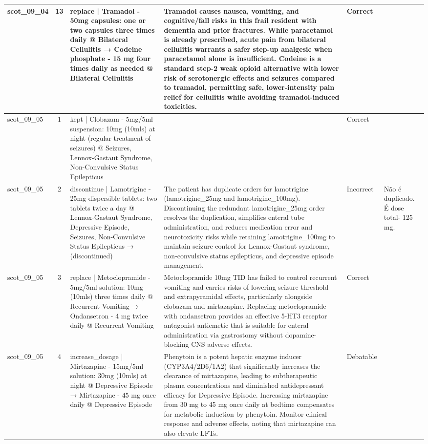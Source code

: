 \begin{longtable}{|p{1.45cm}|c|p{3.3cm}|p{6.5cm}|p{1.55cm}|p{2.3cm}|}
\hline
scot\_09\_04 & 13 & replace | Tramadol - 50mg capsules: one or two capsules three times daily @ Bilateral Cellulitis → Codeine phosphate - 15 mg four times daily as needed @ Bilateral Cellulitis & Tramadol causes nausea, vomiting, and cognitive/fall risks in this frail resident with dementia and prior fractures. While paracetamol is already prescribed, acute pain from bilateral cellulitis warrants a safer step-up analgesic when paracetamol alone is insufficient. Codeine is a standard step-2 weak opioid alternative with lower risk of serotonergic effects and seizures compared to tramadol, permitting safe, lower-intensity pain relief for cellulitis while avoiding tramadol-induced toxicities. & Correct &  \\
\hline
scot\_09\_05 & 1 & kept | Clobazam - 5mg/5ml suspension: 10mg (10mls) at night (regular treatment of seizures) @ Seizures, Lennox-Gastaut Syndrome, Non-Convulsive Status Epilepticus &  & Correct &  \\
\hline
scot\_09\_05 & 2 & discontinue | Lamotrigine - 25mg dispersible tablets: two tablets twice a day @ Lennox-Gastaut Syndrome, Depressive Episode, Seizures, Non-Convulsive Status Epilepticus → (discontinued) & The patient has duplicate orders for lamotrigine (lamotrigine\_25mg and lamotrigine\_100mg). Discontinuing the redundant lamotrigine\_25mg order resolves the duplication, simplifies enteral tube administration, and reduces medication error and neurotoxicity risks while retaining lamotrigine\_100mg to maintain seizure control for Lennox-Gastaut syndrome, non-convulsive status epilepticus, and depressive episode management. & Incorrect & Não é duplicado. É dose total- 125 mg. \\
\hline
scot\_09\_05 & 3 & replace | Metoclopramide - 5mg/5ml solution: 10mg (10mls) three times daily @ Recurrent Vomiting → Ondansetron - 4 mg twice daily @ Recurrent Vomiting & Metoclopramide 10mg TID has failed to control recurrent vomiting and carries risks of lowering seizure threshold and extrapyramidal effects, particularly alongside clobazam and mirtazapine. Replacing metoclopramide with ondansetron provides an effective 5-HT3 receptor antagonist antiemetic that is suitable for enteral administration via gastrostomy without dopamine-blocking CNS adverse effects. & Correct &  \\
\hline
scot\_09\_05 & 4 & increase\_dosage | Mirtazapine - 15mg/5ml solution: 30mg (10mls) at night @ Depressive Episode → Mirtazapine - 45 mg once daily @ Depressive Episode & Phenytoin is a potent hepatic enzyme inducer (CYP3A4/2D6/1A2) that significantly increases the clearance of mirtazapine, leading to subtherapeutic plasma concentrations and diminished antidepressant efficacy for Depressive Episode. Increasing mirtazapine from 30 mg to 45 mg once daily at bedtime compensates for metabolic induction by phenytoin. Monitor clinical response and adverse effects, noting that mirtazapine can also elevate LFTs. & Debatable &  \\

\end{longtable}
